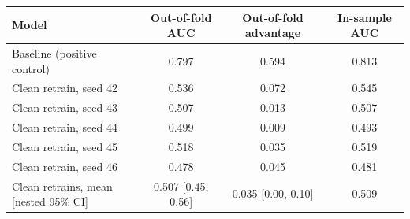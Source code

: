 \begin{tabular}{lccc}
\toprule
Model & Out-of-fold AUC & Out-of-fold advantage & In-sample AUC \\
\midrule
Baseline (positive control) & 0.797 & 0.594 & 0.813 \\
\midrule
Clean retrain, seed 42 & 0.536 & 0.072 & 0.545 \\
Clean retrain, seed 43 & 0.507 & 0.013 & 0.507 \\
Clean retrain, seed 44 & 0.499 & 0.009 & 0.493 \\
Clean retrain, seed 45 & 0.518 & 0.035 & 0.519 \\
Clean retrain, seed 46 & 0.478 & 0.045 & 0.481 \\
Clean retrains, mean [nested 95\% CI] & 0.507 [0.45, 0.56] & 0.035 [0.00, 0.10] & 0.509 \\
\bottomrule
\end{tabular}

